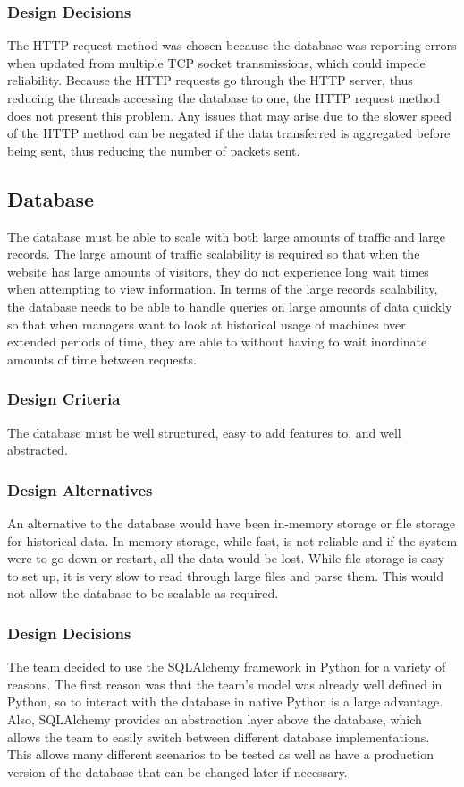 \documentclass[PPFS.tex]{template/subfiles}
\begin{document}
\subsubsection{Design Decisions}
The HTTP request method was chosen because the database was reporting errors when updated from multiple TCP socket transmissions, which could impede reliability. Because the HTTP requests go through the HTTP server, thus reducing the threads accessing the database to one, the HTTP request method does not present this problem. Any issues that may arise due to the slower speed of the HTTP method can be negated if the data transferred is aggregated before being sent, thus reducing the number of packets sent.

\subsection{Database}
The database must be able to scale with both large amounts of traffic and large records. The large amount of traffic scalability is required so that when the website has large amounts of visitors, they do not experience long wait times when attempting to view information. In terms of the large records scalability, the database needs to be able to handle queries on large amounts of data quickly so that when managers want to look at historical usage of machines over extended periods of time, they are able to without having to wait inordinate amounts of time between requests.

\subsubsection{Design Criteria}
The database must be well structured, easy to add features to, and well abstracted.

\subsubsection{Design Alternatives}
An alternative to the database would have been in-memory storage or file storage for historical data. In-memory storage, while fast, is not reliable and if the system were to go down or restart, all the data would be lost. While file storage is easy to set up, it is very slow to read through large files and parse them. This would not allow the database to be scalable as required.

\subsubsection{Design Decisions}
The team decided to use the SQLAlchemy framework in Python for a variety of reasons. The first reason was that the team's model was already well defined in Python, so to interact with the database in native Python is a large advantage. Also, SQLAlchemy provides an abstraction layer above the database, which allows the team to easily switch between different database implementations. This allows many different scenarios to be tested as well as have a production version of the database that can be changed later if necessary.
\end{document}
